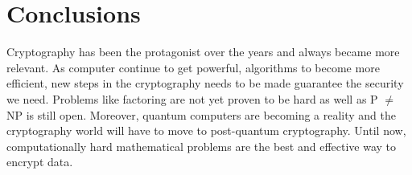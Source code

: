 \chapter{Conclusions}
Cryptography has been the protagonist over the years and always became more relevant. As computer continue to get powerful, algorithms to become more efficient, new steps in the cryptography needs to be made guarantee the security we need. Problems like factoring are not yet proven to be hard as well as P $\neq$ NP is still open. Moreover, quantum computers are becoming a reality and the cryptography world will have to move to post-quantum cryptography. Until now, computationally hard mathematical problems are the best and effective way to encrypt data.
